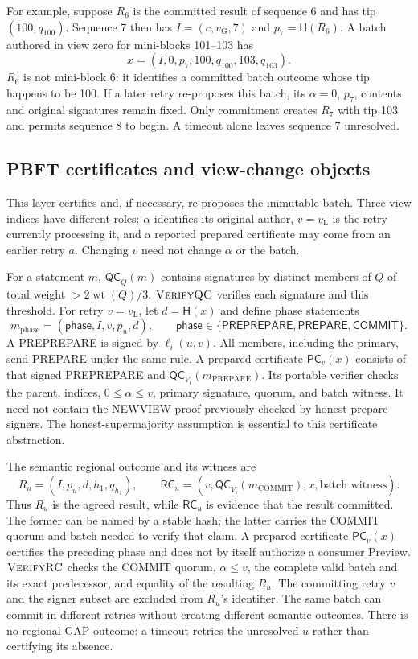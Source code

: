 \documentclass[11pt,a4paper,onecolumn]{article}
\newcommand{\Hash}{\mathsf H}
\newcommand{\QC}{\mathsf{QC}}
\newcommand{\RC}{\mathsf{RC}}
\newcommand{\gv}{v_{\mathrm G}}
\newcommand{\lv}{v_{\mathrm L}}
\newcommand{\PC}{\mathsf{PC}}
\newcommand{\wt}{\operatorname{wt}}
\newcommand{\Tag}[1]{\mathsf{#1}}
\newcommand{\Proc}[1]{\textnormal{\textsc{#1}}}
\theoremstyle{remark}\newtheorem{example}[definition]{Example}
\begin{document}
For example, suppose $R_6$ is the committed result of sequence 6 and has tip
$(100,q_{100})$. Sequence 7 then has $I=(c,\gv,7)$ and $p_7=\Hash(R_6)$.
A batch authored in view zero for mini-blocks 101--103 has
\[
 x=(I,0,p_7,100,q_{100},103,q_{103}).
\]
$R_6$ is not mini-block 6: it identifies a committed batch outcome whose tip
happens to be 100. If a later retry re-proposes this batch, its $\alpha=0$,
$p_7$, contents and original signatures remain fixed. Only commitment creates
$R_7$ with tip 103 and permits sequence 8 to begin. A timeout alone leaves
sequence 7 unresolved.

\subsection{PBFT certificates and view-change objects}\label{sec:pbftobjects}
This layer certifies and, if necessary, re-proposes the immutable batch.
Three view indices have different roles: $\alpha$ identifies its original
author, $v=\lv$ is the retry currently processing it, and a reported prepared
certificate may come from an earlier retry $a$. Changing $v$ need not change
$\alpha$ or the batch.

For a statement $m$, $\QC_Q(m)$ contains signatures by distinct members of $Q$
of total weight $>2\wt(Q)/3$. $\Proc{VerifyQC}$ verifies each signature and this
threshold. For retry $v=\lv$, let $d=\Hash(x)$ and define phase statements
\[
 m_{\mathrm{phase}}=(\Tag{phase},I,v,p_u,d),\qquad
 \mathsf{phase}\in\{\mathsf{PREPREPARE},\mathsf{PREPARE},\mathsf{COMMIT}\}.
\]
A PREPREPARE is signed by $\ell_i(u,v)$. All members, including the primary,
send PREPARE under the same rule. A prepared certificate $\PC_v(x)$ consists
of that signed PREPREPARE and $\QC_{V_i}(m_{\mathrm{PREPARE}})$.
Its portable verifier checks the parent, indices, $0\leq\alpha\leq v$,
primary signature, quorum, and batch witness. It need not contain the NEWVIEW proof previously checked
by honest prepare signers. The honest-supermajority assumption is essential
to this certificate abstraction.

The semantic regional outcome and its witness are
\begin{equation}\label{eq:rc}
 R_u=(I,p_u,d,h_1,q_{h_1}),\qquad
 \RC_u=(v,\QC_{V_i}(m_{\mathrm{COMMIT}}),x,\text{batch witness}).
\end{equation}
Thus $R_u$ is the agreed result, while $\RC_u$ is evidence that the result
committed. The former can be named by a stable hash; the latter carries the
COMMIT quorum and batch needed to verify that claim. A prepared certificate
$\PC_v(x)$ certifies the preceding phase and does not by itself authorize a
consumer Preview.
$\Proc{VerifyRC}$ checks the COMMIT quorum, $\alpha\leq v$, the complete valid
batch and its exact predecessor, and equality of the resulting $R_u$.
The committing retry $v$ and the signer subset are excluded from $R_u$'s
identifier. The same batch can commit in different retries without creating
different semantic outcomes. There is no regional GAP outcome: a timeout
retries the unresolved $u$ rather than certifying its absence.
\end{document}
